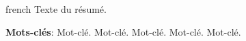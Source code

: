 \begin{resumo}[Résumé]
    \begin{otherlanguage*}{french}
        Texte du résumé.\par
        \textbf{Mots-clés}: Mot-clé. Mot-clé. Mot-clé. Mot-clé. Mot-clé.
    \end{otherlanguage*}
\end{resumo}